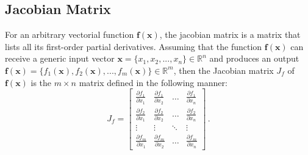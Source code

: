 \subsection{Jacobian Matrix} \label{add:jacobian_matrix}
For an arbitrary vectorial function $\mathbf{f}(\mathbf{x})$, the jacobian matrix is a matrix that lists all its first-order partial derivatives.
Assuming that the function $\mathbf{f}(\mathbf{x})$ can receive a generic input vector $\mathbf{x} = \{x_1, x_2, ..., x_n\} \in \mathbb{R}^n$ and produces an output $\mathbf{f}(\mathbf{x}) = \{f_1(\mathbf{x}), f_2(\mathbf{x}), ..., f_m(\mathbf{x})\} \in \mathbb{R}^m$, then the Jacobian matrix $J_f$ of $\mathbf{f}(\mathbf{x})$ is the $m\times n$ matrix defined in the following manner:
    \begin{equation*}
        J_f = 
        \begin{bmatrix}
            \frac{\partial f_1}{\partial x_1} & \frac{\partial f_1}{\partial x_2} & \dots & \frac{\partial f_1}{\partial x_n} \\[6pt]
            \frac{\partial f_2}{\partial x_1} & \frac{\partial f_2}{\partial x_2} & \dots & \frac{\partial f_2}{\partial x_n} \\[6pt]
            \vdots & \vdots & \ddots & \vdots \\[6pt]
            \frac{\partial f_m}{\partial x_1} & \frac{\partial f_m}{\partial x_2} & \dots & \frac{\partial f_m}{\partial x_n}
        \end{bmatrix}\,.
    \end{equation*}